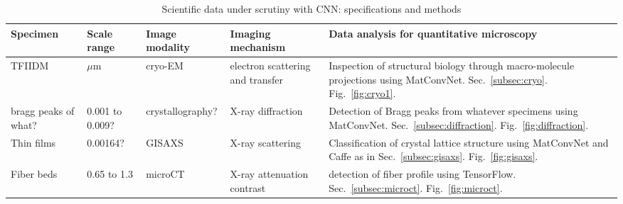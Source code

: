 
\begin{table*}[h!]
\centering
\caption{Scientific data under scrutiny with CNN: specifications and methods}
\label{table1}
\begin{tabular}{p{2cm}p{1.6cm}p{1.6cm}p{3cm}p{7.5cm}}
\hline
\rowcolor[HTML]{CCE5FF}
Specimen  &  Scale range  &  Image \newline modality  &  Imaging  \newline mechanism  &  Data analysis for quantitative microscopy
\\
\hline
\rowcolor[HTML]{FFFFFF} %
TFIIDM & $\mu$m & cryo-EM & electron scattering and transfer & Inspection of structural biology through macro-molecule projections using MatConvNet. Sec.~\ref{subsec:cryo}. Fig.~\ref{fig:cryo1}.
\\
\hline
\rowcolor[HTML]{F6F6F4} %
bragg peaks of what? & 0.001 to 0.009?  & crystallography? & X-ray diffraction  & Detection of Bragg peaks from whatever specimens using MatConvNet. Sec.~\ref{subsec:diffraction}. Fig.~\ref{fig:diffraction}.
\\
\hline
\rowcolor[HTML]{FFFFFF} %
Thin films   & 0.00164?  & GISAXS  & X-ray scattering & Classification of crystal lattice structure using MatConvNet and Caffe as in Sec.~\ref{subsec:gisaxs}. Fig.~\ref{fig:gisaxs}.
\\
\hline
\rowcolor[HTML]{F6F6F4} %
Fiber beds & 0.65 to 1.3 & microCT  & X-ray attenuation contrast & detection of fiber profile using TensorFlow. Sec.~\ref{subsec:microct}. Fig.~\ref{fig:microct}.
\\
\hline
\end{tabular}
\end{table*}
